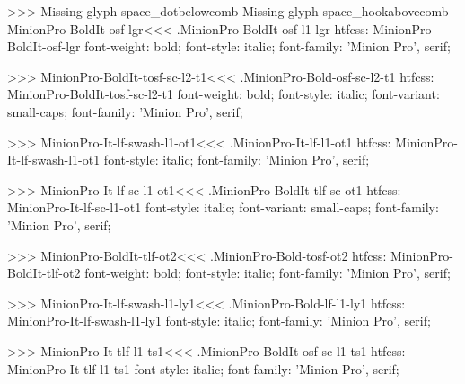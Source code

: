 {>>>
Missing glyph	space_dotbelowcomb
Missing glyph	space_hookabovecomb
\<MinionPro-BoldIt-osf-lgr\><<<
.MinionPro-BoldIt-osf-l1-lgr
htfcss:  MinionPro-BoldIt-osf-lgr  font-weight: bold; font-style: italic; font-family: 'Minion Pro', serif;

>>>
\<MinionPro-BoldIt-tosf-sc-l2-t1\><<<
.MinionPro-Bold-osf-sc-l2-t1
htfcss:  MinionPro-BoldIt-tosf-sc-l2-t1  font-weight: bold; font-style: italic; font-variant: small-caps; font-family: 'Minion Pro', serif;

>>>
\<MinionPro-It-lf-swash-l1-ot1\><<<
.MinionPro-It-lf-l1-ot1
htfcss:  MinionPro-It-lf-swash-l1-ot1  font-style: italic; font-family: 'Minion Pro', serif;

>>>
\<MinionPro-It-lf-sc-l1-ot1\><<<
.MinionPro-BoldIt-tlf-sc-ot1
htfcss:  MinionPro-It-lf-sc-l1-ot1  font-style: italic; font-variant: small-caps; font-family: 'Minion Pro', serif;

>>>
\<MinionPro-BoldIt-tlf-ot2\><<<
.MinionPro-Bold-tosf-ot2
htfcss:  MinionPro-BoldIt-tlf-ot2  font-weight: bold; font-style: italic; font-family: 'Minion Pro', serif;

>>>
\<MinionPro-It-lf-swash-l1-ly1\><<<
.MinionPro-Bold-lf-l1-ly1
htfcss:  MinionPro-It-lf-swash-l1-ly1  font-style: italic; font-family: 'Minion Pro', serif;

>>>
\<MinionPro-It-tlf-l1-ts1\><<<
.MinionPro-BoldIt-osf-sc-l1-ts1
htfcss:  MinionPro-It-tlf-l1-ts1  font-style: italic; font-family: 'Minion Pro', serif;

}
